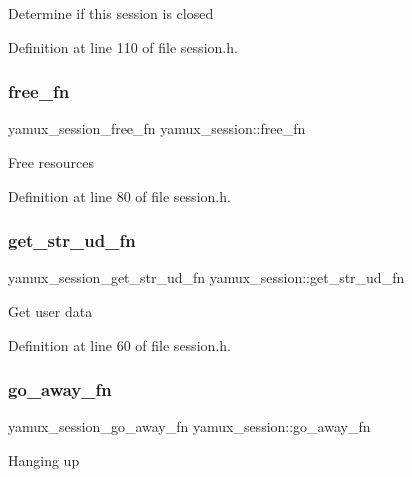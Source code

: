 Determine if this session is closed 

Definition at line 110 of file session.\+h.

\mbox{\label{structyamux__session_a9db63a1c68be6644105926f64636d849}} 
\subsubsection{\texorpdfstring{free\+\_\+fn}{free\_fn}}
{\footnotesize\ttfamily yamux\+\_\+session\+\_\+free\+\_\+fn yamux\+\_\+session\+::free\+\_\+fn}

Free resources 

Definition at line 80 of file session.\+h.

\mbox{\label{structyamux__session_a62609306d0e7416f3f0ac8b758c5cfae}} 
\subsubsection{\texorpdfstring{get\+\_\+str\+\_\+ud\+\_\+fn}{get\_str\_ud\_fn}}
{\footnotesize\ttfamily yamux\+\_\+session\+\_\+get\+\_\+str\+\_\+ud\+\_\+fn yamux\+\_\+session\+::get\+\_\+str\+\_\+ud\+\_\+fn}

Get user data 

Definition at line 60 of file session.\+h.

\mbox{\label{structyamux__session_a7b9877d769f3dcf49964b7b15c84b832}} 
\subsubsection{\texorpdfstring{go\+\_\+away\+\_\+fn}{go\_away\_fn}}
{\footnotesize\ttfamily yamux\+\_\+session\+\_\+go\+\_\+away\+\_\+fn yamux\+\_\+session\+::go\+\_\+away\+\_\+fn}

Hanging up 

